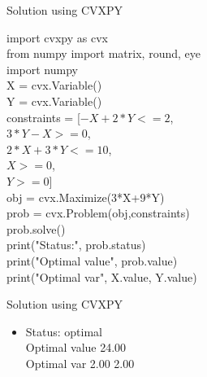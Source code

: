 \documentclass{beamer}
\begin{document}
\begin{frame}{Solution using CVXPY}

import cvxpy as cvx\\
from numpy import matrix, round, eye\\
import numpy\\
X = cvx.Variable()\\
Y = cvx.Variable()\\

constraints = [$-X+2*Y<=2$,\\
\hspace{2.3 cm}$3*Y-X>=0$,\\
\hspace{2.3 cm}$2*X+3*Y<=10$,\\
\hspace{2.3 cm} $X>=0$,\\
\hspace{2.3 cm}$Y>=0$]\\

obj = cvx.Maximize(3*X+9*Y)\\

prob = cvx.Problem(obj,constraints)\\
prob.solve()\\

print("Status:", prob.status)\\
print("Optimal value", prob.value)\\
print("Optimal var", X.value, Y.value)\\

\end{frame}

\begin{frame}{Solution using CVXPY}
\begin{itemize}
  \item Status: optimal\\
Optimal value 24.00\\
Optimal var 2.00 2.00\\
\end{itemize}

\vskip 1cm
\end{frame}
\end{document}
